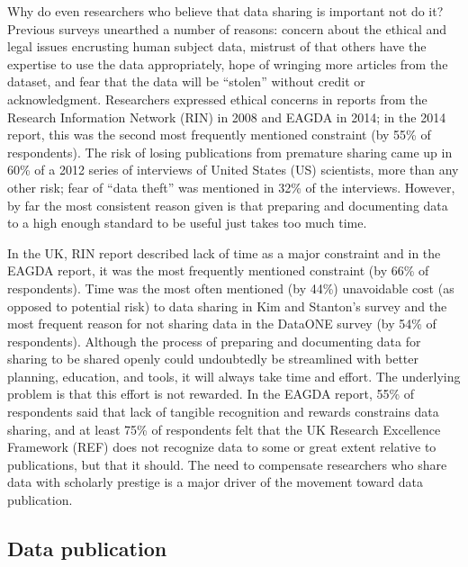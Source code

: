 \documentclass[10pt]{article}
\begin{document}
Why do even researchers who believe that data sharing is important not do it?
Previous surveys unearthed a number of reasons: concern about the ethical and legal issues encrusting human subject data, mistrust of that others have the expertise to use the data appropriately, hope of wringing more articles from the dataset, and fear that the data will be ``stolen'' without credit or acknowledgment.
Researchers expressed ethical concerns in reports from the Research Information Network (RIN) in 2008 and EAGDA in 2014; in the 2014 report, this was the second most frequently mentioned constraint (by 55\% of respondents)\cite{swann_share_2008, bobrow_establishing_2014}.
The risk of losing publications from premature sharing came up in 60\% of a 2012 series of interviews of United States (US) scientists, more than any other risk; fear of ``data theft'' was mentioned in 32\% of the interviews\cite{kim_institutional_2012}.
However, by far the most consistent reason given is that preparing and documenting data to a high enough standard to be useful just takes too much time.

In the UK, RIN report described lack of time as a major constraint\cite{swan_share_2008} and in the EAGDA report, it was the most frequently mentioned constraint (by 66\% of respondents)\cite{bobrow_establishing_2014}.
Time was the most often mentioned (by 44\%) unavoidable cost (as opposed to potential risk) to data sharing in Kim and Stanton's survey\cite{kim_institutional_2012} and the most frequent reason for not sharing data in the DataONE survey (by 54\% of respondents)\cite{tenopir_data_2011}.
Although the process of preparing and documenting data for sharing to be shared openly could undoubtedly be streamlined with better planning, education, and tools, it will always take time and effort.
The underlying problem is that this effort is not rewarded.
In the EAGDA report, 55\% of respondents said that lack of tangible recognition and rewards constrains data sharing, and at least 75\% of respondents felt that the UK Research Excellence Framework (REF) does not recognize data to some or great extent relative to publications, but that it should.
The need to compensate researchers who share data with scholarly prestige is a major driver of the movement toward data publication.
 
\subsection*{Data publication}
 
\end{document}
